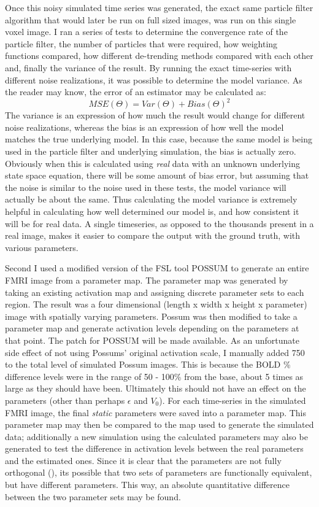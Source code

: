Once this noisy simulated time series was generated, the exact same particle filter algorithm
that would later be run on full sized images, was run on this single voxel image. I ran
a series of tests to determine the convergence rate of the particle filter, the number
of particles that were required, how weighting functions compared, how different de-trending
methods compared with each other and, finally the variance of the result. By running the exact
time-series with different noise realizations, it was possible to determine the model variance.
As the reader may know, the error of an estimator may be calculated as:
\begin{equation}
MSE(\Theta) = Var(\Theta) + Bias(\Theta)^2
\end{equation}
The variance is an expression of how much the result would change for different noise realizations,
whereas the bias is an expression of how well the model matches the true underlying model. In
this case, because the same model is being used in the particle filter and underlying simulation,
the bias is actually zero. Obviously when this is calculated using \emph{real} data with an unknown
underlying state space equation, there will be some amount of bias error, but assuming that the
noise is similar to the noise used in these tests, the model variance will actually be about the
same. Thus calculating the model variance is extremely helpful in calculating how well determined
our model is, and how consistent it will be for real data. A single timeseries, as opposed to the
thousands present in a real image, makes it easier to 
compare the output with the ground truth, with various parameters. 

Second I used a modified version of the FSL tool 
POSSUM to generate an entire FMRI image from a parameter map. The parameter map was generated
by taking an existing activation map and assigning discrete parameter sets to each region.
The result was a four dimensional (length x width
x height x parameter) image with spatially varying parameters. Possum was then modified
to take a parameter map and generate activation levels depending on the parameters at that
point. The patch for POSSUM will be made available. As an unfortunate side effect of 
not using Possums' original activation scale, I manually added 750 to the total level of
simulated Possum images. This is because the BOLD \% difference levels were in the range
of 50 - 100\% from the base, about 5 times as large as they should have been. Ultimately
this should not have an effect on the parameters (other than perhaps $\epsilon$ and $V_0$). 
For each time-series in the simulated FMRI image, the final \emph{static} parameters were saved
into a parameter map. This parameter map may then be compared to the map used to generate the 
simulated data; additionally a new simulation using the calculated parameters may also be 
generated to test the difference in activation levels between the real parameters and the
estimated ones. Since it is clear that the parameters are not fully orthogonal 
(\cite{Deneux2006}), its possible that two sets of parameters are functionally equivalent,
but have different parameters. This way, an absolute 
quantitative difference between the two parameter sets may be found.

